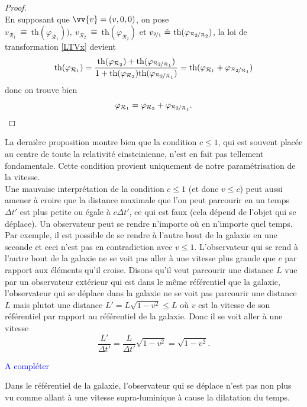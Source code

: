 \documentclass[a4paper,11pt]{report}
\theoremstyle{definition}
\theoremstyle{plain}
\theoremstyle{definition}
\theoremstyle{remark}
\renewcommand{\th}[1]{\text{th}(#1)}
\newcommand{\comp}{\begin{center}\textcolor{blue}{A compléter}\end{center}}
\newcommand{\R}{\mathcal{R}}
\begin{document}
            \begin{proof}
            ${}$\\
                En supposant que $\vv{v} = (v,0,0)$, on pose $v_{\R_1} ~\hat{=}~ \th{\varphi_{\R_1})},~ v_{\R_2} ~\hat{=}~ \th{\varphi_{\R_2}}$ et $v_{\nicefrac{2}{1}} ~\hat{=}~ \th{\varphi_{\nicefrac{\R_2}{\R_2}}}$, la loi de transformation \ref{LTVx} devient
                \begin{equation}
                    \th{\varphi_{\R_1}} = \frac{\th{\varphi_{\R_2}}+\th{\varphi_{\nicefrac{\R_2}{\R_1}}}}{1+\th{\varphi_{\R_2}}\th{\varphi_{\nicefrac{\R_2}{\R_1}}}} = \th{\varphi_{\R_1}+\varphi_{\nicefrac{\R_2}{\R_1}}}
                \end{equation}
                donc on trouve bien
                \begin{equation}
                    \varphi_{\R_1} = \varphi_{\R_2}+\varphi_{\nicefrac{\R_2}{\R_1}}.
                \end{equation}
            \end{proof}
            
            La dernière proposition montre bien que la condition $c\leq 1$, qui est souvent placée au centre de toute la relativité einsteinienne, n'est en fait pas tellement fondamentale. Cette condition provient uniquement de notre paramétrisation de la vitesse.\\
            
            Une mauvaise interprétation de la condition $c\leq1$ (et donc $v\leq c$) peut aussi amener à croire que la distance maximale que l'on peut parcourir en un temps $\Delta t'$ est plus petite ou égale à $c\Delta t'$, ce qui est faux (cela dépend de l'objet qui se déplace). Un observateur peut se rendre n'importe où en n'importe quel temps. Par exemple, il est possible de se rendre à l'autre bout de la galaxie en une seconde et ceci n'est pas en contradiction avec $v\leq 1$. L'observateur qui se rend à l'autre bout de la galaxie ne se voit pas aller à une vitesse plus grande que $c$ par rapport aux éléments qu'il croise. Disons qu'il veut parcourir une distance $L$ vue par un observateur extérieur qui est dans le même référentiel que la galaxie, l'observateur qui se déplace dans la galaxie ne se voit pas parcourir une distance $L$ mais plutot une distance $L' = L\sqrt{1-v^2}\leq L$ où $v$ est la vitesse de son référentiel par rapport au référentiel de la galaxie. Donc il se voit aller à une vitesse
            \begin{equation}
                \frac{L'}{\Delta t'} = \frac{L}{\Delta t'} \sqrt{1-v^2} = \sqrt{1-v^2}.
            \end{equation}
            \comp
            Dans le référentiel de la galaxie, l'observateur qui se déplace n'est pas non plus vu comme allant à une vitesse supra-luminique à cause la dilatation du temps.\\
            
\end{document}
